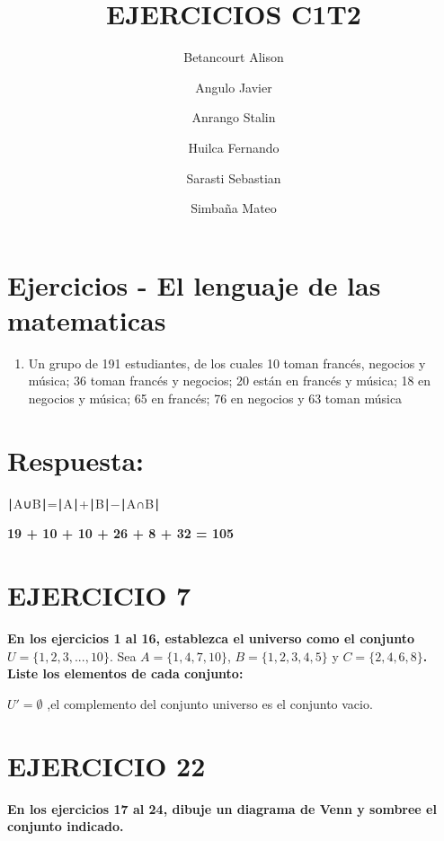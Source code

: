 \documentclass[
  letterpaper,
  DIV=11,
  numbers=noendperiod]{scrartcl}
\title{EJERCICIOS C1T2}
\author{Betancourt Alison \and Angulo Javier \and Anrango
Stalin \and Huilca Fernando \and Sarasti Sebastian \and Simbaña Mateo}
\date{}
\providecommand{\tightlist}{%
  \setlength{\itemsep}{0pt}\setlength{\parskip}{0pt}}\usepackage{longtable,booktabs,array}
\renewcommand*\contentsname{Table of contents}
\newcommand\contentsname{Table of contents}
\begin{document}
\maketitle
\renewcommand*\contentsname{Contenido}
{
\hypersetup{linkcolor=}
\setcounter{tocdepth}{3}
\tableofcontents
}
\hypertarget{ejercicios---el-lenguaje-de-las-matematicas}{%
\section{Ejercicios - El lenguaje de las
matematicas}\label{ejercicios---el-lenguaje-de-las-matematicas}}

\begin{enumerate}
\def\labelenumi{\arabic{enumi}.}
\setcounter{enumi}{26}
\tightlist
\item
  Un grupo de 191 estudiantes, de los cuales 10 toman francés, negocios
  y música; 36 toman francés y negocios; 20 están en francés y música;
  18 en negocios y música; 65 en francés; 76 en negocios y 63 toman
  música
\end{enumerate}

\hypertarget{respuesta}{%
\section{Respuesta:}\label{respuesta}}

∣A∪B∣=∣A∣+∣B∣−∣A∩B∣

\textbf{19 + 10 + 10 + 26 + 8 + 32 = 105}

\hypertarget{ejercicio-7}{%
\section{EJERCICIO 7}\label{ejercicio-7}}

\textbf{En los ejercicios 1 al 16, establezca el universo como el
conjunto} \(U=\{1, 2, 3, . . . , 10\}\). Sea \(A=\{1, 4, 7, 10\}\),
\(B=\{1, 2, 3, 4, 5\}\) y \(C=\{2,4, 6, 8\}\)\textbf{. Liste los
elementos de cada conjunto:}

\(U' = \emptyset\) ,el complemento del conjunto universo es el conjunto
vacio.

\hypertarget{ejercicio-22}{%
\section{EJERCICIO 22}\label{ejercicio-22}}

\textbf{En los ejercicios 17 al 24, dibuje un diagrama de Venn y sombree
el conjunto indicado.}
\end{document}
